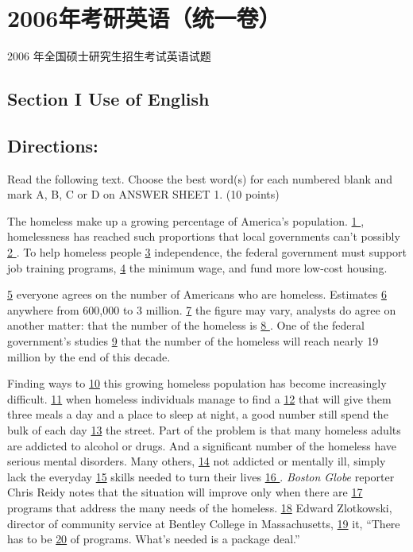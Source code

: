 \documentclass[UTF8,11pt]{ctexart}
\begin{document}
\section*{2006年考研英语（统一卷）}
2006 年全国硕士研究生招生考试英语试题


\subsection*{\textbf{Section I Use of English}}


\subsection*{\textbf{Directions:}}


Read the following text. Choose the best word(s) for each numbered blank and mark A, B, C or D on ANSWER SHEET 1. (10 points)


The homeless make up a growing percentage of America’s population. \uline{1 }, homelessness has reached such proportions that local governments can’t possibly \uline{2 }. To help homeless people \uline{3} independence, the federal government must support job training programs, \uline{4} the minimum wage, and fund more low-cost housing.


\uline{5} everyone agrees on the number of Americans who are homeless. Estimates \uline{6} anywhere from 600,000 to 3 million. \uline{7} the figure may vary, analysts do agree on another matter: that the number of the homeless is \uline{8 }. One of the federal government’s studies \uline{9} that the number of the homeless will reach nearly 19 million by the end of this decade.


Finding ways to \uline{10} this growing homeless population has become increasingly difficult. \uline{11} when homeless individuals manage to find a \uline{12} that will give them three meals a day and a place to sleep at night, a good number still spend the bulk of each day \uline{13} the street. Part of the problem is that many homeless adults are addicted to alcohol or drugs. And a significant number of the homeless have serious mental disorders. Many others, \uline{14} not addicted or mentally ill, simply lack the everyday \uline{15} skills needed to turn their lives \uline{16 }. \textit{Boston Globe} reporter Chris Reidy notes that the situation will improve only when there are \uline{17} programs that address the many needs of the homeless. \uline{18} Edward Zlotkowski, director of community service at Bentley College in Massachusetts, \uline{19} it, “There has to be \uline{20} of programs. What’s needed is a package deal.”
\end{document}
